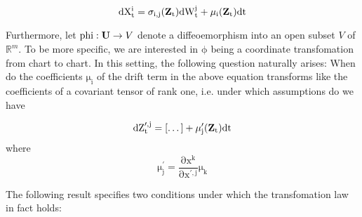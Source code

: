 \documentclass[11pt,english]{smfart}
\newcommand{\U}{{\bf{U}}}
\newcommand{\Z}{{\bf{Z}_{\textrm{t}}}}
\begin{document}
\begin{equation}
\mathrm{d X^{i}_{t}= \sigma_{i,j}(\Z)dW^{j}_{t}+\mu_{i}(\Z)dt}
\end{equation}

Furthermore, let $\mathrm{phi}:\U\rightarrow V$ denote a diffeoemorphism into an open subset $V$ of $\mathbb{R}^{m}$. To be more specific, we are interested in $\mathrm{\phi}$ being a coordinate transfomation from 
chart to chart. In this setting, the following question naturally arises: When do the coefficients $\mathrm{\mu_{i}}$ of the drift term in the above equation transforms like the coefficients of a  covariant tensor of rank one, i.e. under which assumptions do we have  

\begin{equation}
\mathrm{d Z^{\prime,j}_{t}=[\dots] +\mu^{\prime}_{j}(\Z)dt}
\end{equation} where 
\begin{equation}
\mathrm{\mu^{\prime}_{j}=\frac{\partial x^{k}}{\partial x^{\prime , j}}\mu_{k}}
\end{equation} 

The following result specifies two conditions under which the transfomation law in fact holds:
\end{document}
